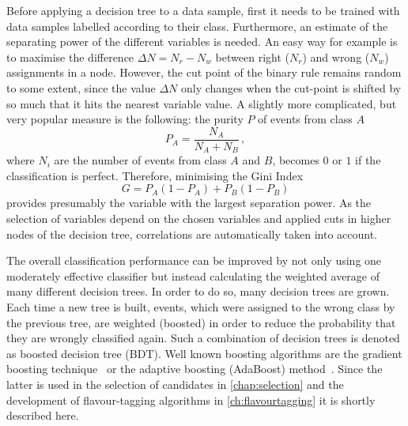 Before applying a decision tree to a data sample, first it needs to be trained with data samples labelled according to their class.
Furthermore, an estimate of the separating power of the different variables is needed.
An easy way for example is to maximise the difference $\Delta N=N_r-N_w$ between right ($N_r$) and wrong ($N_w$) assignments in a node.
However, the cut point of the binary rule remains random to some extent, since the value $\Delta N$ only changes when the cut-point is shifted by so much that it hits the nearest variable value.
A slightly more complicated, but very popular measure is the following:
the purity $P$ of events from class $A$
\begin{equation}
P_A=\frac{N_A}{N_A+N_B}\,,
\end{equation}
where $N_i$ are the number of events from class $A$ and $B$, becomes $0$ or $1$ if the classification is perfect.
Therefore, minimising the Gini Index~\cite{Bohm:389738}
\begin{equation}
G=P_A\left(1-P_A\right)+P_B\left(1-P_B\right)
\end{equation}
provides presumably the variable with the largest separation power.
As the selection of variables depend on the chosen variables and applied cuts in higher nodes of the decision tree, correlations are automatically taken into account.

The overall classification performance can be improved by not only using one moderately effective classifier but instead calculating the weighted average of many different decision trees.
In order to do so, many decision trees are grown.
Each time a new tree is built, events, which were assigned to the wrong class by the previous tree, are weighted (boosted) in order to reduce the probability that they are wrongly classified again.
Such a combination of decision trees is denoted as boosted decision tree (\ac{BDT}).
Well known boosting algorithms are the gradient boosting technique~\cite{gradientBoost} or the adaptive boosting (AdaBoost) method~\cite{AdaBoost}.
Since the latter is used in the selection of \BdToDpi candidates in \cref{chap:selection} and the development of flavour-tagging algorithms in \cref{ch:flavourtagging} it is shortly described here.

